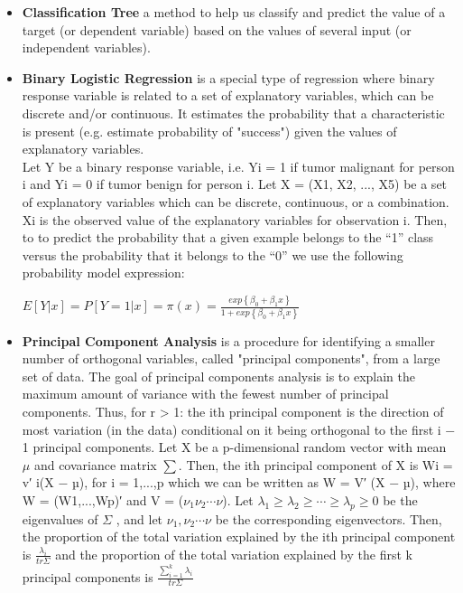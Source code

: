 \documentclass[a4paper, 12pt, one column, aas_macros]{article}
\begin{document}
\begin{itemize}




\item \textbf{Classification Tree }  a method to help us classify and predict the value of a target (or dependent variable) based on the values of several input (or independent variables).

\item \textbf{Binary Logistic Regression }  is a special type of regression where binary response variable is related to a set of explanatory variables, which can be discrete and/or continuous. It estimates the probability that a characteristic is present (e.g. estimate probability of "success") given the values of explanatory variables.
\\
Let Y be a binary response variable, i.e.
Yi = 1 if tumor malignant for person i and Yi = 0 if tumor benign  for person i. Let X = (X1, X2, ..., X5) be a set of explanatory variables which can be discrete, continuous, or a combination. Xi is the observed value of the explanatory variables for observation i. Then, to to predict the probability that a given example belongs to the “1” class versus the probability that it belongs to the “0” we use the following probability model expression:

$E[Y | x]=P[Y = 1 | x]=\pi(x)= \frac
	{exp\left \{ \beta _{0} + \beta _{1}x  \right \}}
	{1+exp \left \{ \beta _{0} + \beta _{1}x \right\}}
$
\citet{MCN2}
\item \textbf{Principal Component Analysis}
is a procedure for identifying a smaller number of orthogonal variables, called "principal components", from a large set of data. The goal of principal components analysis is to explain the maximum amount of variance with the fewest number of principal components. Thus, for r > 1: the ith principal component is the direction of most variation
(in the data) conditional on it being orthogonal to the first i − 1
principal components. Let X be a p-dimensional random vector with mean $\mu$ and covariance
matrix $\sum$.
Then, the ith principal component of X is
Wi = v′
i(X − µ),
for i = 1,...,p which we can be written as
W = V′
(X − µ),
where W = (W1,...,Wp)′ and V = ($\nu_{1}  \nu_{2} \cdots \nu$). Let  $\lambda_{1}  \geq  \lambda_{2} \geq\cdots \geq  \lambda_{p} \geq  0 $ be the 
eigenvalues of $\Sigma$ , and let
$\nu_{1},  \nu_{2} \cdots \nu$ be the corresponding eigenvectors. Then, the proportion of the total variation explained by the ith principal
component is $\frac{\lambda _{i} }{tr{\Sigma }}$ and the proportion of the total variation explained by the first k principal components is $\frac{\sum_{i=1}^{k} \lambda _{i} }{tr{\Sigma }}$ \citet{MCN}


\end{itemize}
\end{document}
